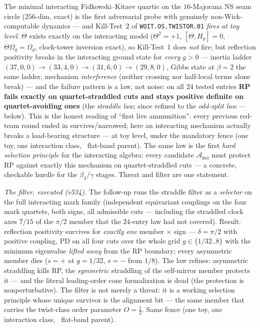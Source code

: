 \begin{gapbox}
The minimal interacting Fidkowski--Kitaev quartic on the $16$-Majorana NS seam circle
($256$-dim, exact) is the first adversarial probe with genuinely non-Wick-computable dynamics
--- and Kill-Test~2 of \texttt{WOIT.OS.TWISTOR.01} \emph{fires at toy level}. $\Theta$ exists
exactly on the interacting model ($\Theta^2={+}1$, $[\Theta,H_g]=0$, $\Theta\Omega_g=\Omega_g$,
clock-tower inversion exact), so Kill-Test~1 does \emph{not} fire; but reflection positivity
breaks in the interacting ground state for \emph{every} $g>0$ --- inertia ladder
$(37,0,0)\to(33,4,0)\to(31,6,0)\to(29,8,0)$, Gibbs state at $\beta=2$ the same ladder, mechanism
\emph{interference} (neither crossing nor half-local terms alone break) --- and the failure
pattern is a law, not noise: on all $24$ tested entries \textbf{RP fails exactly on
quartet-straddled cuts and stays positive definite on quartet-avoiding ones} (the
\emph{straddle law}; since refined to the \emph{odd-split law} --- below). This is the honest reading of ``first live ammunition'': every previous
red-team round ended in survives/narrowed; here an interacting mechanism actually breaks a
load-bearing structure --- at toy level, under the mandatory fence (one toy, one interaction
class, \mC\ flat-band parent). The same law is the first \emph{hard selection principle} for the
interacting algebra: every candidate $\mathcal A_{\mathrm{hol}}$ must protect RP against exactly
this mechanism on quartet-straddled cuts --- a concrete, checkable hurdle for the $\beta_3/\gamma$
stages. Threat and filter are one statement. 

\smallskip\noindent\emph{The filter, executed (v534).} The follow-up runs the straddle filter as a
\emph{selector} on the full interacting mark family (independent equivariant couplings on the four
mark quartets, both signs, all admissible cuts --- including the straddled clock axes $7/15$ of the
$\pi/2$ member that the $24$-entry law had not covered). Result: reflection positivity survives for
\emph{exactly one} member $\times$ sign --- $\delta=\pi/2$ with positive coupling, PD on all four
cuts over the whole grid $g\in\{1/32..8\}$ with the minimum eigenvalue \emph{lifted away} from the
RP boundary; every asymmetric member dies ($s{=}+$ at $g=1/32$, $s{=}-$ from $1/8$). The law
refines: asymmetric straddling kills RP, the \emph{symmetric} straddling of the self-mirror member
protects it --- and the literal leading-order cone formalization is dead (the protection is
nonperturbative). The filter is not merely a threat: it is a working selection principle whose
unique survivor is the alignment bit --- the same member that carries the twist-class order
parameter $O=\tfrac12$. Same fence (one toy, one interaction class, \mC\ flat-band parent).


\end{gapbox}

